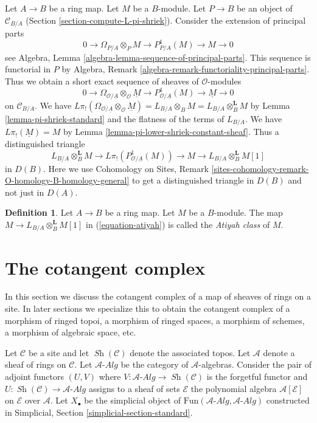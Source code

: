 \documentclass{stacks-project}
\theoremstyle{plain}
\theoremstyle{definition}
\newtheorem{definition}[subsection]{Definition}
\theoremstyle{remark}
\numberwithin{equation}{subsection}
\def\Sh{\mathop{\mathit{Sh}}\nolimits}
\begin{document}
\noindent
Let $A \to B$ be a ring map. Let $M$ be a $B$-module.
Let $P \to B$ be an object of $\mathcal{C}_{B/A}$
(Section \ref{section-compute-L-pi-shriek}).
Consider the extension of principal parts
$$
0 \to \Omega_{P/A} \otimes_P M \to P^1_{P/A}(M) \to M \to 0
$$
see Algebra, Lemma \ref{algebra-lemma-sequence-of-principal-parts}.
This sequence is functorial in $P$ by
Algebra, Remark \ref{algebra-remark-functoriality-principal-parts}.
Thus we obtain a short exact sequence of sheaves of $\mathcal{O}$-modules
$$
0 \to \Omega_{\mathcal{O}/\underline{A}} \otimes_\mathcal{O} \underline{M} \to
P^1_{\mathcal{O}/\underline{A}}(M) \to \underline{M} \to 0
$$
on $\mathcal{C}_{B/A}$. We have
$L\pi_!(\Omega_{\mathcal{O}/\underline{A}} \otimes_\mathcal{O} \underline{M})
= L_{B/A} \otimes_B M = L_{B/A} \otimes_B^\mathbf{L} M$
by Lemma \ref{lemma-pi-shriek-standard} and the flatness of
the terms of $L_{B/A}$.
We have $L\pi_!(\underline{M}) = M$ by
Lemma \ref{lemma-pi-lower-shriek-constant-sheaf}.
Thus a distinguished triangle
\begin{equation}
\label{equation-atiyah}
L_{B/A} \otimes_B^\mathbf{L} M \to
L\pi_!\left(P^1_{\mathcal{O}/\underline{A}}(M)\right) \to M
\to L_{B/A} \otimes_B^\mathbf{L} M [1]
\end{equation}
in $D(B)$. Here we use Cohomology on Sites, Remark
\ref{sites-cohomology-remark-O-homology-B-homology-general}
to get a distinguished triangle in $D(B)$ and not just in $D(A)$.

\begin{definition}
\label{definition-atiyah-class}
Let $A \to B$ be a ring map. Let $M$ be a $B$-module.
The map $M \to L_{B/A} \otimes_B^\mathbf{L} M[1]$
in (\ref{equation-atiyah}) is called the {\it Atiyah class} of $M$.
\end{definition}




\section{The cotangent complex}
\label{section-cotangent-complex}

\noindent
In this section we discuss the cotangent complex of a map of sheaves
of rings on a site. In later sections we specialize this to obtain
the cotangent complex of a morphism of ringed topoi, a morphism of
ringed spaces, a morphism of schemes, a morphism of algebraic space, etc.

\medskip\noindent
Let $\mathcal{C}$ be a site and let $\Sh(\mathcal{C})$ denote the
associated topos. Let $\mathcal{A}$ denote a sheaf of rings
on $\mathcal{C}$. Let $\mathcal{A}\textit{-Alg}$ be the category of
$\mathcal{A}$-algebras. Consider the pair of adjoint functors $(U, V)$ where
$V : \mathcal{A}\textit{-Alg} \to \Sh(\mathcal{C})$ is the forgetful functor and
$U : \Sh(\mathcal{C}) \to \mathcal{A}\textit{-Alg}$ assigns to a sheaf of sets
$\mathcal{E}$ the polynomial algebra $\mathcal{A}[\mathcal{E}]$ on
$\mathcal{E}$ over $\mathcal{A}$.
Let $X_\bullet$ be the simplicial object of
$\text{Fun}(\mathcal{A}\textit{-Alg}, \mathcal{A}\textit{-Alg})$
constructed in
Simplicial, Section \ref{simplicial-section-standard}.
\end{document}
